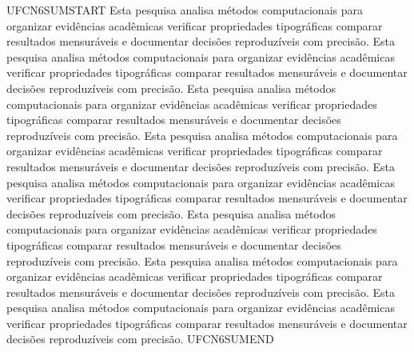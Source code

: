 UFCN6SUMSTART Esta pesquisa analisa métodos computacionais para organizar evidências acadêmicas verificar propriedades tipográficas comparar resultados mensuráveis e documentar decisões reproduzíveis com precisão. Esta pesquisa analisa métodos computacionais para organizar evidências acadêmicas verificar propriedades tipográficas comparar resultados mensuráveis e documentar decisões reproduzíveis com precisão. Esta pesquisa analisa métodos computacionais para organizar evidências acadêmicas verificar propriedades tipográficas comparar resultados mensuráveis e documentar decisões reproduzíveis com precisão. Esta pesquisa analisa métodos computacionais para organizar evidências acadêmicas verificar propriedades tipográficas comparar resultados mensuráveis e documentar decisões reproduzíveis com precisão. Esta pesquisa analisa métodos computacionais para organizar evidências acadêmicas verificar propriedades tipográficas comparar resultados mensuráveis e documentar decisões reproduzíveis com precisão. Esta pesquisa analisa métodos computacionais para organizar evidências acadêmicas verificar propriedades tipográficas comparar resultados mensuráveis e documentar decisões reproduzíveis com precisão. Esta pesquisa analisa métodos computacionais para organizar evidências acadêmicas verificar propriedades tipográficas comparar resultados mensuráveis e documentar decisões reproduzíveis com precisão. Esta pesquisa analisa métodos computacionais para organizar evidências acadêmicas verificar propriedades tipográficas comparar resultados mensuráveis e documentar decisões reproduzíveis com precisão. UFCN6SUMEND

